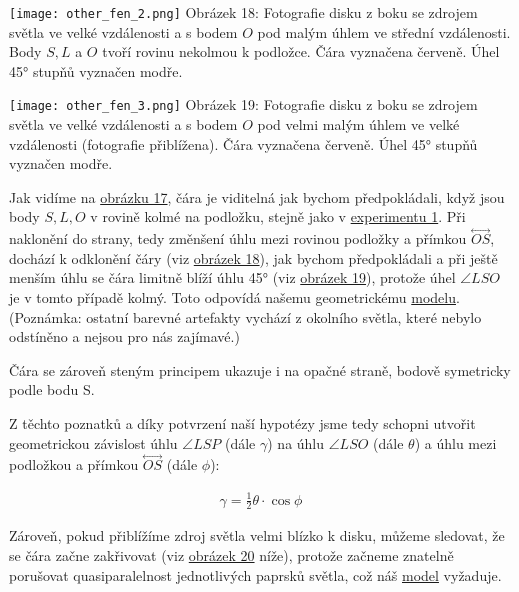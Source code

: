 \documentclass[titlepage]{article}
\begin{document}
 \label{image:18}
\begin{center}
    \texttt{[image: other\_fen\_2.png]}
    \linebreak
    Obrázek 18: Fotografie disku z boku se zdrojem světla ve velké vzdálenosti a s bodem $O$ pod malým úhlem ve střední vzdálenosti. Body $S, L$ a $O$ tvoří rovinu nekolmou k podložce. Čára vyznačena červeně. Úhel 45° stupňů vyznačen modře.
\end{center}

 \label{image:19}
\begin{center}
    \texttt{[image: other\_fen\_3.png]}
    \linebreak
    Obrázek 19: Fotografie disku z boku se zdrojem světla ve velké vzdálenosti a s bodem $O$ pod velmi malým úhlem ve velké vzdálenosti (fotografie přiblížena). Čára vyznačena červeně. Úhel 45° stupňů vyznačen modře.
\end{center}

Jak vidíme na \hyperref[image:17]{obrázku 17}, čára je viditelná jak bychom předpokládali, když jsou body $S, L, O$ v rovině kolmé na podložku, stejně jako v \hyperref[exp:1]{experimentu 1}.
Při naklonění do strany, tedy změnšení úhlu mezi rovinou podložky a přímkou $\overset{\longleftrightarrow}{OS}$, dochází k odklonění čáry (viz \hyperref[image:18]{obrázek 18}), jak bychom předpokládali a při ještě menším úhlu se čára limitně blíží úhlu 45° (viz \hyperref[image:19]{obrázek 19}), protože úhel $\angle LSO$ je v tomto případě kolmý. Toto odpovídá našemu geometrickému \hyperref[sec:other_fen]{modelu}.
(Poznámka: ostatní barevné artefakty vychází z okolního světla, které nebylo odstíněno a nejsou pro nás zajímavé.)

Čára se zároveň steným principem ukazuje i na opačné straně, bodově symetricky podle bodu S.

Z těchto poznatků a díky potvrzení naší hypotézy jsme tedy schopni utvořit geometrickou závislost úhlu $\angle LSP$ (dále $\gamma$) na úhlu $\angle LSO$ (dále $\theta$) a úhlu mezi podložkou a přímkou $\overset{\longleftrightarrow}{OS}$ (dále $\phi$):

\begin{equation}\label{eq9}
    \begin{gathered}
        \gamma = \frac{1}{2} \theta \cdot \cos{\phi}
    \end{gathered}
\end{equation}

Zároveň, pokud přiblížíme zdroj světla velmi blízko k disku, můžeme sledovat, že se čára začne zakřivovat (viz \hyperref[image:20]{obrázek 20} níže), protože začneme znatelně porušovat quasiparalelnost jednotlivých paprsků světla, což náš \hyperref[sec:other_fen]{model} vyžaduje.
\end{document}
